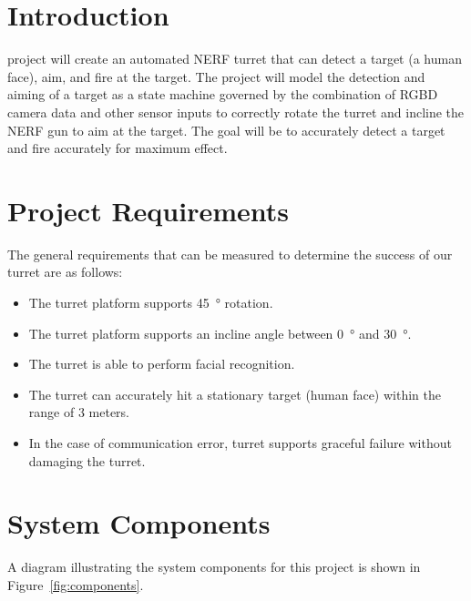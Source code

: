 \documentclass[journal]{IEEEtran}
\begin{document}

\section{Introduction}

 project will create an automated NERF turret that can detect a target (a human face), aim, and fire at the target. The project will model the detection and aiming of a target as a state machine governed by the combination of RGBD camera data and other sensor inputs to correctly rotate the turret and incline the NERF gun to aim at the target. The goal will be to accurately detect a target and fire accurately for maximum effect.

\section{Project Requirements}

The general requirements that can be measured to determine the success of our turret are as follows:
\begin{itemize}
\item
The turret platform supports \SI{45}{\degree} rotation.
\item
The turret platform supports an incline angle between \SI{0}{\degree} and \SI{30}{\degree}.
\item
The turret is able to perform facial recognition.
\item
The turret can accurately hit a stationary target (human face) within the range of 3 meters.
\item
In the case of communication error, turret supports graceful failure without damaging the turret.
\end{itemize}

\section{System Components}

A diagram illustrating the system components for this project is shown in Figure~\ref{fig:components}. 
\end{document}
